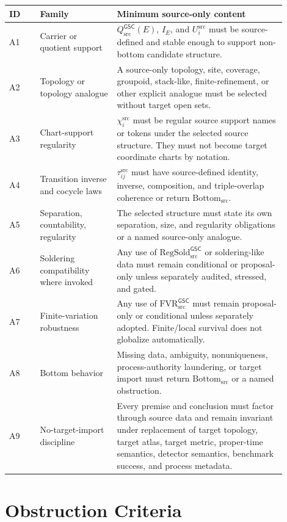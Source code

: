 \documentclass[11pt]{article}
\newcommand{\GSC}{\mathsf{GSC}}
\newcommand{\Qsrc}{Q_{\mathrm{src}}^{\GSC}}
\newcommand{\Bottomsrc}{\mathrm{Bottom}_{\mathrm{src}}}
\newcommand{\FVR}{\mathrm{FVR}_{\mathrm{src}}^{\GSC}}
\newcommand{\RegSold}{\mathrm{RegSold}_{\mathrm{src}}^{\GSC}}
\begin{document}
\begin{longtable}{|p{0.10\linewidth}|p{0.25\linewidth}|p{0.55\linewidth}|}
\hline
\textbf{ID} & \textbf{Family} & \textbf{Minimum source-only content} \\
\hline
A1 & Carrier or quotient support & \(\Qsrc(E)\), \(I_E\), and \(U_i^{\mathrm{src}}\) must be source-defined and stable enough to support non-bottom candidate structure. \\
\hline
A2 & Topology or topology analogue & A source-only topology, site, coverage, groupoid, stack-like, finite-refinement, or other explicit analogue must be selected without target open sets. \\
\hline
A3 & Chart-support regularity & \(\chi_i^{\mathrm{src}}\) must be regular source support names or tokens under the selected source structure. They must not become target coordinate charts by notation. \\
\hline
A4 & Transition inverse and cocycle laws & \(\tau_{ij}^{\mathrm{src}}\) must have source-defined identity, inverse, composition, and triple-overlap coherence or return \(\Bottomsrc\). \\
\hline
A5 & Separation, countability, regularity & The selected structure must state its own separation, size, and regularity obligations or a named source-only analogue. \\
\hline
A6 & Soldering compatibility where invoked & Any use of \(\RegSold\) or soldering-like data must remain conditional or proposal-only unless separately audited, stressed, and gated. \\
\hline
A7 & Finite-variation robustness & Any use of \(\FVR\) must remain proposal-only or conditional unless separately adopted. Finite/local survival does not globalize automatically. \\
\hline
A8 & Bottom behavior & Missing data, ambiguity, nonuniqueness, process-authority laundering, or target import must return \(\Bottomsrc\) or a named obstruction. \\
\hline
A9 & No-target-import discipline & Every premise and conclusion must factor through source data and remain invariant under replacement of target topology, target atlas, target metric, proper-time semantics, detector semantics, benchmark success, and process metadata. \\
\hline
\end{longtable}

\section{Obstruction Criteria}
\end{document}
